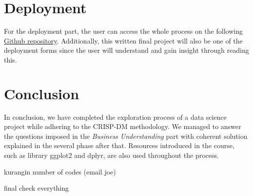 \documentclass[12pt,]{article}
\begin{document}
\hypertarget{deployment}{%
\section{Deployment}\label{deployment}}

For the deployment part, the user can access the whole process on the
following \href{https://github.com/c1040783/CSC8631}{Github repository}.
Additionally, this written final project will also be one of the
deployment forms since the user will understand and gain insight through
reading this.

\hypertarget{conclusion}{%
\section{Conclusion}\label{conclusion}}

In conclusion, we have completed the exploration process of a data
science project while adhering to the CRISP-DM methodology. We managed
to answer the questions imposed in the \emph{Business Understanding}
part with coherent solution explained in the several phase after that.
Resources introduced in the course, such as library ggplot2 and dplyr,
are also used throughout the process.

kurangin number of codes (email joe)

final check everything





\newpage
\singlespacing 

\end{document}
